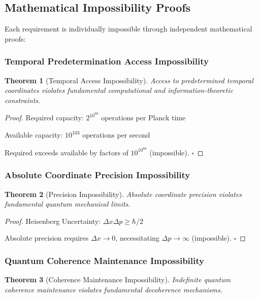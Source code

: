 \documentclass[12pt,a4paper]{article}
\newtheorem{theorem}{Theorem}[section]
\theoremstyle{remark}
\begin{document}
\subsection{Mathematical Impossibility Proofs}

Each requirement is individually impossible through independent mathematical proofs:

\subsubsection{Temporal Predetermination Access Impossibility}

\begin{theorem}[Temporal Access Impossibility]
Access to predetermined temporal coordinates violates fundamental computational and information-theoretic constraints.
\end{theorem}

\begin{proof}
Required capacity: $2^{10^{80}}$ operations per Planck time

Available capacity: $10^{103}$ operations per second

Required exceeds available by factors of $10^{10^{80}}$ (impossible). $\square$
\end{proof}

\subsubsection{Absolute Coordinate Precision Impossibility}

\begin{theorem}[Precision Impossibility]
Absolute coordinate precision violates fundamental quantum mechanical limits.
\end{theorem}

\begin{proof}
Heisenberg Uncertainty: $\Delta x \Delta p \geq \hbar/2$

Absolute precision requires $\Delta x \to 0$, necessitating $\Delta p \to \infty$ (impossible). $\square$
\end{proof}

\subsubsection{Quantum Coherence Maintenance Impossibility}

\begin{theorem}[Coherence Maintenance Impossibility]
Indefinite quantum coherence maintenance violates fundamental decoherence mechanisms.
\end{theorem}
\end{document}
